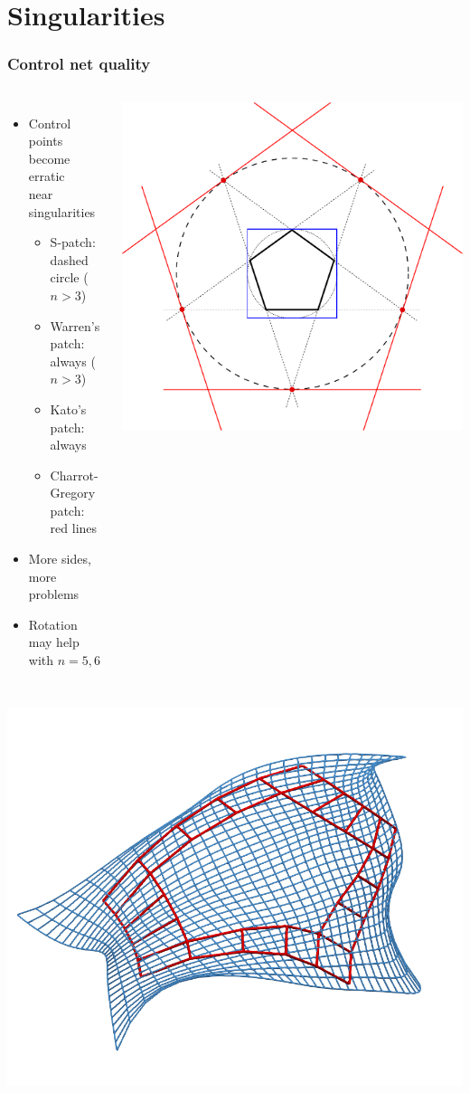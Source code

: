 \documentclass[xcolor=table]{beamer}
\begin{document}
\section{Singularities}

\begin{frame}
  \frametitle{Control net quality}
  \begin{columns}
    \begin{itemize}
    \item Control points become erratic\\near singularities
      \begin{itemize}
      \item S-patch: dashed circle ($n>3$)
      \item Warren's patch: always ($n>3$)
      \item Kato's patch: always
      \item Charrot-Gregory patch: red lines
      \end{itemize}
    \item More sides, more problems
    \item Rotation may help with $n=5,6$
    \end{itemize}
    \includegraphics[width=\textwidth]{images/singularities.pdf}
  \end{columns}
  \vfill
  \includegraphics[width=.32\textwidth]{images/rotations/40.png}

\end{frame}
\end{document}
